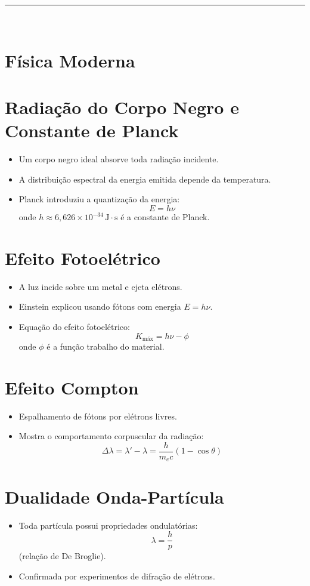\documentclass[a4paper,12pt]{article}
\begin{document}
\begin{multicols}{2}
\noindent\rule{\linewidth}{1pt}\\

\section{Física Moderna}

\section{Radiação do Corpo Negro e Constante de Planck}
\begin{itemize}
    \item Um corpo negro ideal absorve toda radiação incidente.
    \item A distribuição espectral da energia emitida depende da temperatura.
    \item Planck introduziu a quantização da energia:
    \[
        E = h\nu
    \]
    onde $h \approx 6{,}626 \times 10^{-34} \, \text{J} \cdot \text{s}$ é a constante de Planck.
\end{itemize}

\section{Efeito Fotoelétrico}
\begin{itemize}
    \item A luz incide sobre um metal e ejeta elétrons.
    \item Einstein explicou usando fótons com energia $E = h\nu$.
    \item Equação do efeito fotoelétrico:
    \[
        K_{\text{máx}} = h\nu - \phi
    \]
    onde $\phi$ é a função trabalho do material.
\end{itemize}

\section{Efeito Compton}
\begin{itemize}
    \item Espalhamento de fótons por elétrons livres.
    \item Mostra o comportamento corpuscular da radiação:
    \[
        \Delta \lambda = \lambda' - \lambda = \frac{h}{m_e c} (1 - \cos \theta)
    \]
\end{itemize}

\section{Dualidade Onda-Partícula}
\begin{itemize}
    \item Toda partícula possui propriedades ondulatórias:
    \[
        \lambda = \frac{h}{p}
    \]
    (relação de De Broglie).
    \item Confirmada por experimentos de difração de elétrons.
\end{itemize}


\end{multicols}
\end{document}
